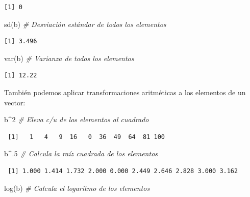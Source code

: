 \documentclass[
  12pt,
  spanish,
]{book}
\newenvironment{Shaded}{\begin{snugshade}}{\end{snugshade}}
\newcommand{\CommentTok}[1]{\textcolor[rgb]{0.56,0.35,0.01}{\textit{#1}}}
\newcommand{\DecValTok}[1]{\textcolor[rgb]{0.00,0.00,0.81}{#1}}
\newcommand{\FunctionTok}[1]{\textcolor[rgb]{0.00,0.00,0.00}{#1}}
\newcommand{\NormalTok}[1]{#1}
\newcommand{\SpecialCharTok}[1]{\textcolor[rgb]{0.00,0.00,0.00}{#1}}
\begin{document}
\begin{verbatim}
[1] 0
\end{verbatim}

\begin{Shaded}
\begin{Highlighting}[]
\FunctionTok{sd}\NormalTok{(b) }\CommentTok{\# Desviación estándar de todos los elementos}
\end{Highlighting}
\end{Shaded}

\begin{verbatim}
[1] 3.496
\end{verbatim}

\begin{Shaded}
\begin{Highlighting}[]
\FunctionTok{var}\NormalTok{(b) }\CommentTok{\# Varianza de todos los elementos}
\end{Highlighting}
\end{Shaded}

\begin{verbatim}
[1] 12.22
\end{verbatim}

También podemos aplicar transformaciones aritméticas a los elementos de un vector:

\begin{Shaded}
\begin{Highlighting}[]
\NormalTok{b}\SpecialCharTok{\^{}}\DecValTok{2} \CommentTok{\# Eleva c/u de los elementos al cuadrado}
\end{Highlighting}
\end{Shaded}

\begin{verbatim}
 [1]   1   4   9  16   0  36  49  64  81 100
\end{verbatim}

\begin{Shaded}
\begin{Highlighting}[]
\NormalTok{b}\SpecialCharTok{\^{}}\NormalTok{.}\DecValTok{5} \CommentTok{\# Calcula la raíz cuadrada de los elementos}
\end{Highlighting}
\end{Shaded}

\begin{verbatim}
 [1] 1.000 1.414 1.732 2.000 0.000 2.449 2.646 2.828 3.000 3.162
\end{verbatim}

\begin{Shaded}
\begin{Highlighting}[]
\FunctionTok{log}\NormalTok{(b) }\CommentTok{\# Calcula el logaritmo de los elementos}
\end{Highlighting}
\end{Shaded}
\end{document}
